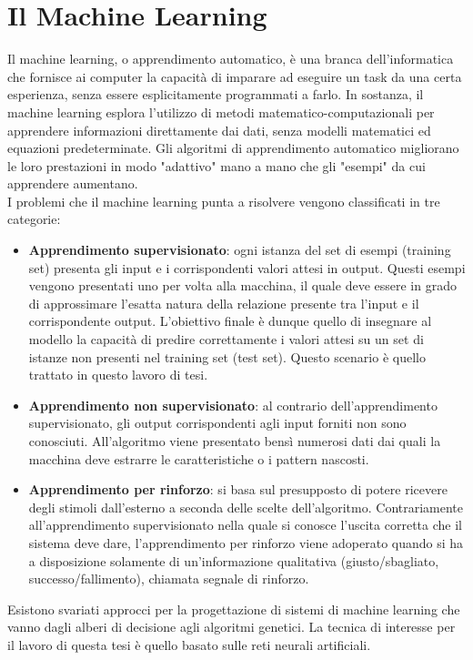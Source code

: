 \section{Il Machine Learning}
Il machine learning, o apprendimento automatico, è una branca dell'informatica che fornisce ai computer la capacità di imparare ad eseguire un task da una certa esperienza, senza essere esplicitamente programmati a farlo. In sostanza, il machine learning esplora l'utilizzo di metodi matematico-computazionali per apprendere informazioni direttamente dai dati, senza modelli matematici ed equazioni predeterminate. Gli algoritmi di apprendimento automatico migliorano le loro prestazioni in modo "adattivo" mano a mano che gli "esempi" da cui apprendere aumentano. \\
I problemi che il machine learning punta a risolvere vengono classificati in tre categorie:
\begin{itemize}
    \item \textbf{Apprendimento supervisionato}: ogni istanza del set di esempi (training set) presenta gli input e i corrispondenti valori attesi in output. Questi esempi vengono presentati uno per volta alla macchina, il quale deve essere in grado di approssimare l'esatta natura della relazione presente tra l'input e il corrispondente output. L’obiettivo finale è dunque quello di insegnare al modello la capacità di predire correttamente i valori attesi su un set di istanze non presenti nel training set (test set). Questo scenario è quello trattato in questo lavoro di tesi.
    \item \textbf{Apprendimento non supervisionato}: al contrario dell'apprendimento supervisionato, gli output corrispondenti agli input forniti non sono conosciuti. All'algoritmo viene presentato bensì numerosi dati dai quali la macchina deve estrarre le caratteristiche o i pattern nascosti. 
    \item \textbf{Apprendimento per rinforzo}: si basa sul presupposto di potere ricevere degli stimoli dall'esterno a seconda delle scelte dell'algoritmo. Contrariamente all’apprendimento supervisionato nella quale si conosce l’uscita corretta che il sistema deve dare, l’apprendimento per rinforzo viene adoperato quando si ha a disposizione solamente di un’informazione qualitativa (giusto/sbagliato, successo/fallimento), chiamata segnale di rinforzo.
\end{itemize}
Esistono svariati approcci per la progettazione di sistemi di machine learning che vanno dagli alberi di decisione agli algoritmi genetici. La tecnica di interesse per il lavoro di questa tesi è quello basato sulle reti neurali artificiali.

